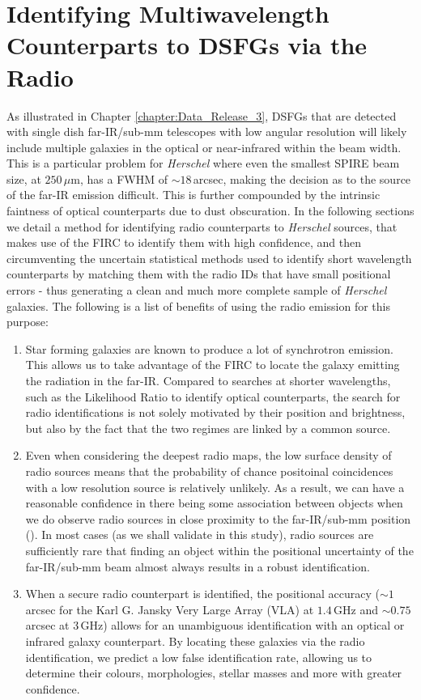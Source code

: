 \section{Identifying Multiwavelength Counterparts to DSFGs via the Radio}

As illustrated in Chapter \ref{chapter:Data_Release_3}, DSFGs that are detected with single dish far-IR/sub-mm telescopes with low angular resolution will likely include multiple galaxies in the optical or near-infrared within the beam width. This is a particular problem for \textit{Herschel} where even the smallest SPIRE beam size, at $250\,\mu$m, has a FWHM of $\sim 18\,$arcsec, making the decision as to the source of the far-IR emission difficult. This is further compounded by the intrinsic faintness of optical counterparts due to dust obscuration. In the following sections we detail a method for identifying radio counterparts to \textit{Herschel} sources, that makes use of the FIRC to identify them with high confidence, and then circumventing the uncertain statistical methods used to identify short wavelength counterparts by matching them with the radio IDs that have small positional errors - thus generating a clean and much more complete sample of \textit{Herschel} galaxies. The following is a list of benefits of using the radio emission for this purpose:

\begin{enumerate}
    \item Star forming galaxies are known to produce a lot of synchrotron emission. This allows us to take advantage of the FIRC to locate the galaxy emitting the radiation in the far-IR. Compared to searches at shorter wavelengths, such as the Likelihood Ratio to identify optical counterparts, the search for radio identifications is not solely motivated by their position and brightness, but also by the fact that the two regimes are linked by a common source.
    \item Even when considering the deepest radio maps, the low surface density of radio sources means that the probability of chance positoinal coincidences with a low resolution source is relatively unlikely. As a result, we can have a reasonable confidence in there being some association between objects when we do observe radio sources in close proximity to the far-IR/sub-mm position (\citealt{Ivison_2002, Borys_2004}). In most cases (as we shall validate in this study), radio sources are sufficiently rare that finding an object within the positional uncertainty of the far-IR/sub-mm beam almost always results in a robust identification.
    \item When a secure radio counterpart is identified, the positional accuracy ($\sim 1\,$arcsec for the Karl G. Jansky Very Large Array (VLA) at $1.4\,$GHz and $\sim 0.75\,$arcsec at $3\,$GHz) allows for an unambiguous identification with an optical or infrared galaxy counterpart. By locating these galaxies via the radio identification, we predict a low false identification rate, allowing us to determine their colours, morphologies, stellar masses and more with greater confidence.
\end{enumerate}

